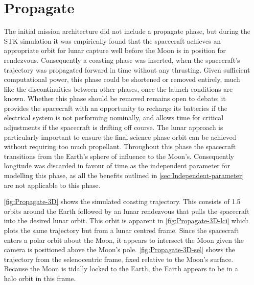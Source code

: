 

\clearpage 


\section{Propagate} \label{sec:Propagate}

The initial mission architecture did not include a propagate phase, but during the STK simulation it was empirically found that the spacecraft achieves an appropriate orbit for lunar capture well before the Moon is in position for rendezvous. Consequently a coasting phase was inserted, when the spacecraft's trajectory was propagated forward in time without any thrusting. Given sufficient computational power, this phase could be shortened or removed entirely, much like the discontinuities between other phases, once the launch conditions are known. Whether this phase should be removed remains open to debate: it provides the spacecraft with an opportunity to recharge its batteries if the electrical system is not performing nominally, and allows time for critical adjustments if the spacecraft is drifting off course. The lunar approach is particularly important to ensure the final science phase orbit can be achieved without requiring too much propellant. Throughout this phase the spacecraft transitions from the Earth's sphere of influence to the Moon's. Consequently longitude was discarded in favour of time as the independent parameter for modelling this phase, as all the benefits outlined in \autoref{sec:Independent-parameter} are not applicable to this phase.

\autoref{fig:Propagate-3D} shows the simulated coasting trajectory. This consists of 1.5 orbits around the Earth followed by an lunar rendezvous that pulls the spacecraft into the desired lunar orbit. This orbit is apparent in \autoref{fig:Propagate-3D-lci} which plots the same trajectory but from a lunar centred frame. Since the spacecraft enters a polar orbit about the Moon, it appears to intersect the Moon given the camera is positioned above the Moon's pole. \autoref{fig:Propagate-3D-sel} shows the trajectory from the selenocentric frame, fixed relative to the Moon's surface. Because the Moon is tidally locked to the Earth, the Earth appears to be in a halo orbit in this frame.

